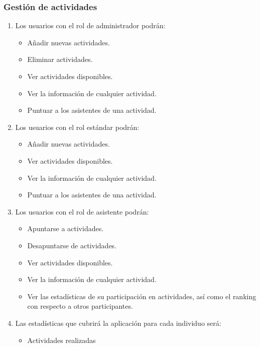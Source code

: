 \subsubsection{Gestión de actividades}

\begin{enumerate}[start=36,label={RF-\arabic*.}]

    \item Los usuarios con el rol de administrador podrán:
        \begin{itemize}
            \item Añadir nuevas actividades.
            \item Eliminar actividades.
            \item Ver actividades disponibles.
            \item Ver la información de cualquier actividad.
            \item Puntuar a los asistentes de una actividad.
        \end{itemize}
    \item Los usuarios con el rol estándar podrán:
        \begin{itemize}
            \item Añadir nuevas actividades.
            \item Ver actividades disponibles.
            \item Ver la información de cualquier actividad.
            \item Puntuar a los asistentes de una actividad.
        \end{itemize}
    \item Los usuarios con el rol de asistente podrán:
        \begin{itemize}
            \item Apuntarse a actividades.
            \item Desapuntarse de actividades.
            \item Ver actividades disponibles.
            \item Ver la información de cualquier actividad.
            \item Ver las estadísticas de su participación en actividades, así como el ranking con respecto a otros participantes.
        \end{itemize}
    \item Las estadísticas que cubrirá la aplicación para cada individuo será:
        \begin{itemize}
            \item Actividades realizadas

\end{itemize}
\end{enumerate}
